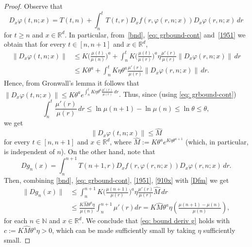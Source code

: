 \documentclass[reqno, a4paper, 10pt]{amsart}
\theoremstyle{plain}
\numberwithin{equation}{section}
\theoremstyle{remark}
\renewcommand{\phi}{\varphi}
\def\N{\mathbb{N}}
\def\R{\mathbb{R}}
\begin{document}
\begin{proof}
 Observe that 
\begin{equation}\label{dphi}
D_x\phi(t, n; x)=T(t,n)+\int_n^t T(t,r)D_xf(r, \phi(r, n;x))D_x\phi(r, n;x)\, dr
\end{equation}
for $t\ge n$ and $x\in \R^d$.  In particular, from~\eqref{bnd}, \eqref{eq: grbound-cont} and~\eqref{1951} we obtain that for every $t\in [n, n+1]$ and $x\in \R^d$,
\[
\begin{split}
\lVert D_x\phi(t, n; x) \rVert&\le K\bigg (\frac{\mu (t)}{\mu (n)} \bigg )^a  + \int_n^t K \bigg (\frac{\mu(t)}{\mu(r)} \bigg )^a \eta \frac{\mu'(r)}{\mu(r)} \lVert D_x\phi(r, n;x)\rVert\, dr
\\
&\le K\theta^a  +\int_n^t K\eta  \theta^a  \frac{\mu'(r)}{\mu(r)} \lVert D_x\phi(r, n;x)\rVert\, dr.
\end{split}
\]
 Hence, from Gronwall's lemma it follows that 
$\lVert D_x\phi(t, n; x) \rVert \le K \theta^a  e^{\int_n^t K\eta  \theta^a  \frac{\mu'(r)}{\mu(r)}\, dr}$. Thus, since (using \eqref{eq: grbound-cont})
\begin{equation}\label{eq: aux int mu' mu}
\int_n^t   \frac{\mu'(r)}{\mu(r)}\, dr\leq  \ln \mu (n+1)-\ln \mu(n)\leq \ln \theta\leq  \theta,
\end{equation}
we get 
\begin{equation}\label{910x}
\lVert D_x\phi(t, n; x) \rVert \le \hat M 
\end{equation}
for every $t\in [n, n+1]$ and $x\in \R^d$, where $\hat M:=K\theta^ae^{K\eta \theta^{a+1} }$ (which, in particular, is independent of $n$).
On the other hand, note that
\begin{equation}\label{Dfm}
Dg_n(x)=\int_n^{n+1}T(n+1, r)D_xf(r, \phi(r, n;x))D_x\phi(r, n;x)\, dr.
\end{equation}
Then, combining \eqref{bnd}, \eqref{eq: grbound-cont}, \eqref{1951}, \eqref{910x} with \eqref{Dfm} we get
\[
\begin{split}
\lVert Dg_n(x) \rVert &\le \int_n^{n+1}K \bigg (\frac{\mu(n+1)}{\mu(r)} \bigg )^a  \eta \frac{\mu'(r)}{\mu(r)} \hat M  \, dr \\
&\le \frac{K\hat M \theta^{a}\eta }{\mu(n)} \int_n^{n+1}\mu'(r)dr =K\hat M \theta^{a}\eta \left( \frac{\mu(n+1)-\mu(n)}{\mu(n)} \right),
\end{split}
\]
for each $n\in \N$ and $x\in \R^d$. We conclude that \eqref{eq: bound deriv g} holds with $c:=K\hat M\theta^{a}\eta >0$, which can be made sufficiently small by taking $\eta$ sufficiently small. 


\end{proof}
\end{document}
